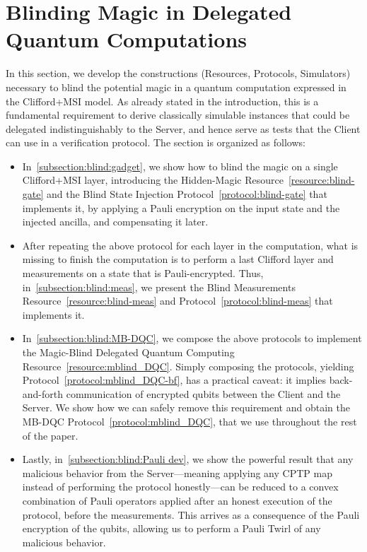 \section{Blinding Magic in Delegated Quantum Computations}

\label{section:blindness}

In this section, we develop the constructions (Resources, Protocols, Simulators) necessary to blind the potential magic in a quantum computation expressed in the Clifford+MSI model. As already stated in the introduction, this is a fundamental requirement to derive classically simulable instances that could be delegated indistinguishably to the Server, and hence serve as tests that the Client can use in a verification protocol. The section is organized as follows:
\begin{itemize}
    \item In~\ref{subsection:blind:gadget}, we show how to blind the magic on a single Clifford+MSI layer, introducing the Hidden-Magic Resource~\ref{resource:blind-gate} and the Blind State Injection Protocol~\ref{protocol:blind-gate} that implements it, by applying a Pauli encryption on the input state and the injected ancilla, and compensating it later.
    \item After repeating the above protocol for each layer in the computation, what is missing to finish the computation is to perform a last Clifford layer and measurements on a state that is Pauli-encrypted. Thus, in~\ref{subsection:blind:meas}, we present the Blind Measurements Resource~\ref{resource:blind-meas} and Protocol~\ref{protocol:blind-meas} that implements it.
    \item In~\ref{subsection:blind:MB-DQC}, we compose the above protocols to implement the Magic-Blind Delegated Quantum Computing Resource~\ref{resource:mblind_DQC}. Simply composing the protocols, yielding Protocol~\ref{protocol:mblind_DQC-bf}, has a practical caveat: it implies back-and-forth communication of encrypted qubits between the Client and the Server. We show how we can safely remove this requirement and obtain the MB-DQC Protocol~\ref{protocol:mblind_DQC}, that we use throughout the rest of the paper.
    \item Lastly, in~\ref{subsection:blind:Pauli dev}, we show the powerful result that any malicious behavior from the Server—meaning applying any CPTP map instead of performing the protocol honestly—can be reduced to a convex combination of Pauli operators applied after an honest execution of the protocol, before the measurements. This arrives as a consequence of the Pauli encryption of the qubits, allowing us to perform a Pauli Twirl of any malicious behavior.
\end{itemize}
